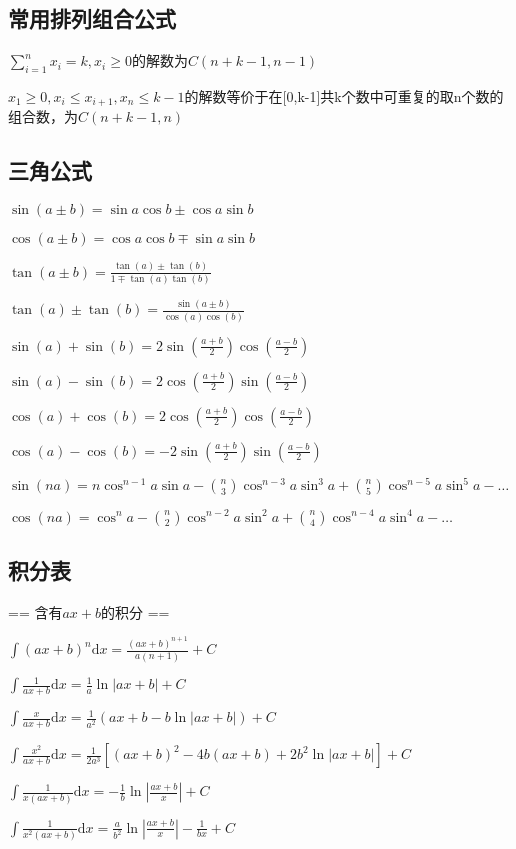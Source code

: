 \subsection{常用排列组合公式}
$\sum_{i=1}^n x_i = k, x_i \geq 0$的解数为$C(n+k-1,n-1)$\par
$x_1 \geq 0,x_i \leq x_{i+1}, x_n \leq k-1$的解数等价于在[0,k-1]共k个数中可重复的取n个数的组合数，为$C(n+k-1,n)$\par

\subsection{三角公式}
$\sin(a \pm b) = \sin a \cos b \pm \cos a \sin b$\par
$\cos(a \pm b) = \cos a \cos b \mp \sin a \sin b$\par
$\tan(a \pm b) = \frac{\tan(a)\pm\tan(b)}{1 \mp \tan(a)\tan(b)}$\par
$\tan(a) \pm \tan(b) = \frac{\sin(a \pm b)}{\cos(a)\cos(b)}$\par
$\sin(a) + \sin(b) = 2\sin(\frac{a + b}{2})\cos(\frac{a - b}{2})$\par
$\sin(a) - \sin(b) = 2\cos(\frac{a + b}{2})\sin(\frac{a - b}{2})$\par
$\cos(a) + \cos(b) = 2\cos(\frac{a + b}{2})\cos(\frac{a - b}{2})$\par
$\cos(a) - \cos(b) = -2\sin(\frac{a + b}{2})\sin(\frac{a - b}{2})$\par
$\sin(na) = n\cos^{n-1}a\sin a - \binom{n}{3}\cos^{n-3}a \sin^3a + \binom{n}{5}\cos^{n-5}a\sin^5a - \dots$\par
$\cos(na) = \cos^{n}a - \binom{n}{2}\cos^{n-2}a \sin^2a + \binom{n}{4}\cos^{n-4}a\sin^4a - \dots$\par

\subsection{积分表}


== 含有$ax+b$的积分 ==\par

$\int (ax+b)^n\mbox{d}x=\frac{(ax+b)^{n+1}}{a(n+1)}+C$\par
$\int\frac{1}{ax+b}\mbox{d}x=\frac{1}{a}\ln \left | ax+b\right|+C$\par
$\int\frac{x}{ax+b}\mbox{d}x=\frac{1}{a^2}(ax+b-b\ln\left |ax+b \right|) +C$\par
$\int\frac{x^2}{ax+b}\mbox{d}x=\frac{1}{2a^3} \left[(ax+b)^2-4b(ax+b)+2b^2 \ln\left |ax+b\right| \right]+C$\par
$\int\frac{1}{x(ax+b)}\mbox{d}x = -\frac{1}{b}\ln\left | \frac{ax+b}{x}\right |+C$\par
$\int\frac{1}{x^2(ax+b)}\mbox{d}x=\frac{a}{b^2}\ln\left |\frac{ax+b}{x}\right |-\frac{1}{bx}+C$\par

